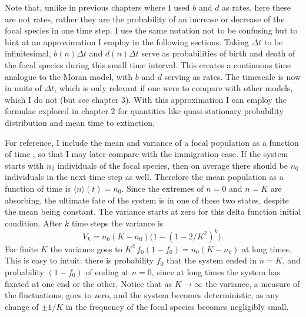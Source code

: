 Note that, unlike in previous chapters where I used $b$ and $d$ as rates, here these are not rates, rather they are the probability of an increase or decrease of the focal species in one time step. 
I use the same notation not to be confusing but to hint at an approximation I employ in the following sections. %
Taking $\Delta t$ to be infinitesimal, $b(n)\Delta t$ and $d(n)\Delta t$ serve as probabilities of birth and death of the focal species during this small time interval. 
This creates a continuous time analogue to the Moran model, with $b$ and $d$ serving as rates. 
The timescale is now in units of $\Delta t$, which is only relevant if one were to compare with other models, which I do not (but see chapter 3). 
With this approximation I can employ the formulae explored in chapter 2 for quantities like quasi-stationary probability distribution and mean time to extinction. 

For reference, I include the mean and variance of a focal population as a function of time \cite{Moran1962,Kimura1964,McKane2003}, so that I may later compare with the immigration case. 
If the system starts with $n_0$ individuals of the focal species, then on average there should be $n_0$ individuals in the next time step as well.
Therefore the mean population as a function of time is $\langle n\rangle(t) = n_0$. 
Since the extremes of $n=0$ and $n=K$ are absorbing, the ultimate fate of the system is in one of these two states, despite the mean being constant. 
The variance starts at zero for this delta function initial condition. 
After $k$ time steps the variance is
\begin{equation*}
V_k = n_0(K-n_0) \big(1-(1-2/K^2)^k\big).
\end{equation*}
For finite $K$ the variance goes to $K^2 \, f_0(1-f_0)=n_0(K-n_0)$ at long times. 
This is easy to intuit: there is probability $f_0$ that the system ended in $n=K$, and probability $(1-f_0)$ of ending at $n=0$, since at long times the system has fixated at one end or the other. 
Notice that as $K\rightarrow\infty$ the variance, a measure of the fluctuations, goes to zero, and the system becomes deterministic, as any change of $\pm 1/K$ in the frequency of the focal species becomes negligibly small. %


